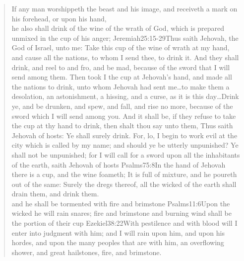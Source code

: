 \begin{verse}
If any man worshippeth the beast and his image, and receiveth a mark on his forehead, or upon his hand,\\
he also shall drink of the wine of the wrath of God, which is prepared unmixed in the cup of his anger;%
				   {Jeremiah}{25:15-29}{Thus saith Jehovah, the God of Israel, unto me: Take this cup of the wine of wrath at my hand, and cause all the nations, to whom I send thee, to drink it. And they shall drink, and reel to and fro, and be mad, because of the sword that I will send among them. Then took I the cup at Jehovah’s hand, and made all the nations to drink, unto whom Jehovah had sent me\ldots to make them a desolation, an astonishment, a hissing, and a curse, as it is this day\ldots Drink ye, and be drunken, and spew, and fall, and rise no more, because of the sword which I will send among you. And it shall be, if they refuse to take the cup at thy hand to drink, then shalt thou say unto them, Thus saith Jehovah of hosts: Ye shall surely drink. For, lo, I begin to work evil at the city which is called by my name; and should ye be utterly unpunished? Ye shall not be unpunished; for I will call for a sword upon all the inhabitants of the earth, saith Jehovah of hosts}%
				   {Psalms}{75:8}{In the hand of Jehovah there is a cup, and the wine foameth; It is full of mixture, and he poureth out of the same: Surely the dregs thereof, all the wicked of the earth shall drain them, and drink them.}\\
and he shall be tormented with fire and brimstone%
					{Psalms}{11:6}{Upon the wicked he will rain snares; fire and brimstone and burning wind shall be the portion of their cup}%
					{Ezekiel}{38:22}{With pestilence and with blood will I enter into judgment with him; and I will rain upon him, and upon his hordes, and upon the many peoples that are with him, an overflowing shower, and great hailstones, fire, and brimstone.} %

\end{verse}
